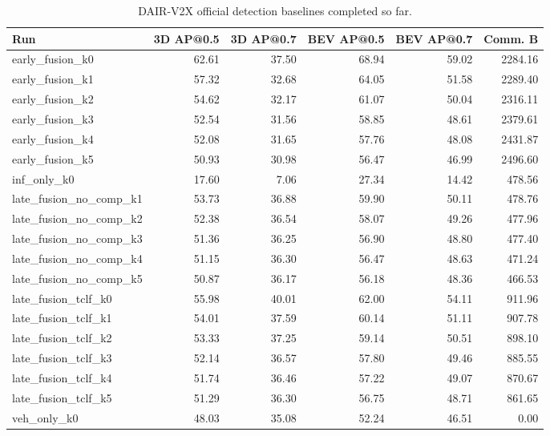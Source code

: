 \begin{table}[t]
\centering
\caption{DAIR-V2X official detection baselines completed so far.}
\label{tab:dair-official-baselines}
\begin{tabular}{lrrrrr}
\toprule
Run & 3D AP@0.5 & 3D AP@0.7 & BEV AP@0.5 & BEV AP@0.7 & Comm. B \\
\midrule
early\_fusion\_k0 & 62.61 & 37.50 & 68.94 & 59.02 & 2284.16 \\
early\_fusion\_k1 & 57.32 & 32.68 & 64.05 & 51.58 & 2289.40 \\
early\_fusion\_k2 & 54.62 & 32.17 & 61.07 & 50.04 & 2316.11 \\
early\_fusion\_k3 & 52.54 & 31.56 & 58.85 & 48.61 & 2379.61 \\
early\_fusion\_k4 & 52.08 & 31.65 & 57.76 & 48.08 & 2431.87 \\
early\_fusion\_k5 & 50.93 & 30.98 & 56.47 & 46.99 & 2496.60 \\
inf\_only\_k0 & 17.60 & 7.06 & 27.34 & 14.42 & 478.56 \\
late\_fusion\_no\_comp\_k1 & 53.73 & 36.88 & 59.90 & 50.11 & 478.76 \\
late\_fusion\_no\_comp\_k2 & 52.38 & 36.54 & 58.07 & 49.26 & 477.96 \\
late\_fusion\_no\_comp\_k3 & 51.36 & 36.25 & 56.90 & 48.80 & 477.40 \\
late\_fusion\_no\_comp\_k4 & 51.15 & 36.30 & 56.47 & 48.63 & 471.24 \\
late\_fusion\_no\_comp\_k5 & 50.87 & 36.17 & 56.18 & 48.36 & 466.53 \\
late\_fusion\_tclf\_k0 & 55.98 & 40.01 & 62.00 & 54.11 & 911.96 \\
late\_fusion\_tclf\_k1 & 54.01 & 37.59 & 60.14 & 51.11 & 907.78 \\
late\_fusion\_tclf\_k2 & 53.33 & 37.25 & 59.14 & 50.51 & 898.10 \\
late\_fusion\_tclf\_k3 & 52.14 & 36.57 & 57.80 & 49.46 & 885.55 \\
late\_fusion\_tclf\_k4 & 51.74 & 36.46 & 57.22 & 49.07 & 870.67 \\
late\_fusion\_tclf\_k5 & 51.29 & 36.30 & 56.75 & 48.71 & 861.65 \\
veh\_only\_k0 & 48.03 & 35.08 & 52.24 & 46.51 & 0.00 \\
\bottomrule
\end{tabular}
\end{table}

